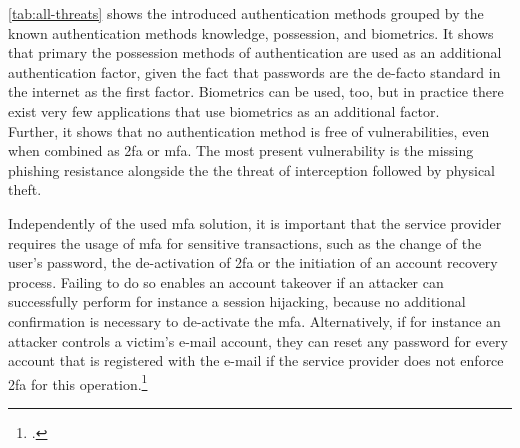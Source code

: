 \autoref{tab:all-threats} shows the introduced authentication methods grouped by the known authentication methods knowledge, possession, and biometrics. It shows that primary the possession methods of authentication are used as an additional authentication factor, given the fact that passwords are the de-facto standard in the internet as the first factor. Biometrics can be used, too, but in practice there exist very few applications that use biometrics as an additional factor.\\
Further, it shows that no authentication method is free of vulnerabilities, even when combined as \gls{2fa} or \gls{mfa}. The most present vulnerability is the missing phishing resistance alongside the the threat of interception followed by physical theft.

Independently of the used \gls{mfa} solution, it is important that the service provider requires the usage of \gls{mfa} for sensitive transactions, such as the change of the user's password, the de-activation of \gls{2fa} or the initiation of an account recovery process. Failing to do so enables an account takeover if an attacker can successfully perform for instance a session hijacking, because no additional confirmation is necessary to de-activate the \gls{mfa}. Alternatively, if for instance an attacker controls a victim's e-mail account, they can reset any password for every account that is registered with the e-mail if the service provider does not enforce \gls{2fa} for this operation.\footcites[See][370]{10.1007/978-3-662-45472-5_24}